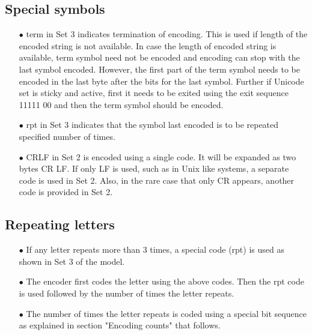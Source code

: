 \documentclass[]{article}
\begin{document}
	\subsection{Special symbols}
	\begin{itemize}
		\item[$\bullet$] term in Set 3 indicates termination of encoding. This is used if length of the encoded string is not available. In case the length of encoded string is available, term symbol need not be encoded and encoding can stop with the last symbol encoded. However, the first part of the term symbol needs to be encoded in the last byte after the bits for the last symbol. Further if Unicode set is sticky and active, first it needs to be exited using the exit sequence 11111 00 and then the term symbol should be encoded.
		\item[$\bullet$] rpt in Set 3 indicates that the symbol last encoded is to be repeated specified number of times.
		\item[$\bullet$] CRLF in Set 2 is encoded using a single code. It will be expanded as two bytes CR LF. If only LF is used, such as in Unix like systems, a separate code is used in Set 2. Also, in the rare case that only CR appears, another code is provided in Set 2.
	\end{itemize}
	
	\subsection{Repeating letters}
	\begin{itemize}
		\item[$\bullet$] If any letter repeats more than 3 times, a special code (rpt) is used as shown in Set 3 of the model.
		\item[$\bullet$] The encoder first codes the letter using the above codes. Then the rpt code is used followed by the number of times the letter repeats.
		\item[$\bullet$] The number of times the letter repeats is coded using a special bit sequence as explained in section "Encoding counts" that follows.
	\end{itemize}
	
\end{document}
